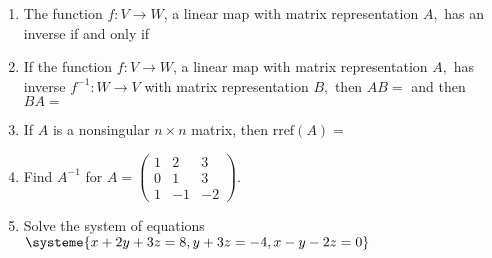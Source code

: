 \documentclass[11pt,fleqn]{article}
\begin{document}
\renewcommand{\headrulewidth}{0pt}
\newcommand{\blank}[1]{\rule{#1}{0.75pt}}
\renewcommand{\d}{\displaystyle}

\newcommand{\bpm}{\begin{pmatrix}}
\newcommand{\epm}{\end{pmatrix}}
\newcommand{\bbm}{\begin{bmatrix}}
\newcommand{\ebm}{\end{bmatrix}}

\vspace*{-0.7in}

\begin{center}
  \large {}
\end{center}

\begin{enumerate}
\item The function $f: V \to W$, a linear map with matrix representation $A,$ has an inverse if and only if\\
\vfill

\item If the function $f: V \to W$, a linear map with matrix representation $A,$ has inverse $f^{-1}: W \to V$ with matrix representation $B,$  then $AB=$ \hspace{.5in} and then $BA=$ \hspace{.5in}\\
\vfill
\item If $A$ is a nonsingular $n \times n$ matrix, then $\text{rref}(A)=$ 
\vfill
\newpage

\item Find $A^{-1}$ for $A=\bpm 1&2&3\\0&1&3\\1&-1&-2 \epm.$
\vfill
\item Solve the system of equations $\systeme{x+2y+3z=8,y+3z=-4,x-y-2z=0}$
\vfill
\end{enumerate}
\end{document}

